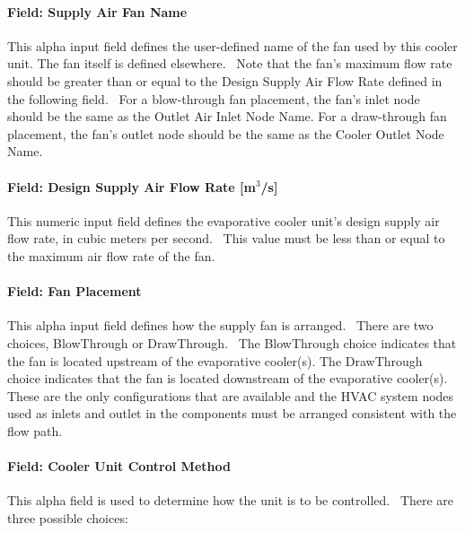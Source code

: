 \paragraph{Field: Supply Air Fan Name}\label{field-supply-air-fan-name-3-000}

This alpha input field defines the user-defined name of the fan used by this cooler unit. The fan itself is defined elsewhere.~ Note that the fan's maximum flow rate should be greater than or equal to the Design Supply Air Flow Rate defined in the following field.~ For a blow-through fan placement, the fan's inlet node should be the same as the Outlet Air Inlet Node Name. For a draw-through fan placement, the fan's outlet node should be the same as the Cooler Outlet Node Name.

\paragraph{Field: Design Supply Air Flow Rate {[}m\(^{3}\)/s{]}}\label{field-design-supply-air-flow-rate-m3s}

This numeric input field defines the evaporative cooler unit's design supply air flow rate, in cubic meters per second.~ This value must be less than or equal to the maximum air flow rate of the fan.

\paragraph{Field: Fan Placement}\label{field-fan-placement-001}

This alpha input field defines how the supply fan is arranged.~ There are two choices, BlowThrough or DrawThrough.~ The BlowThrough choice indicates that the fan is located upstream of the evaporative cooler(s). The DrawThrough choice indicates that the fan is located downstream of the evaporative cooler(s). These are the only configurations that are available and the HVAC system nodes used as inlets and outlet in the components must be arranged consistent with the flow path.

\paragraph{Field: Cooler Unit Control Method}\label{field-cooler-unit-control-method}

This alpha field is used to determine how the unit is to be controlled.~ There are three possible choices:


